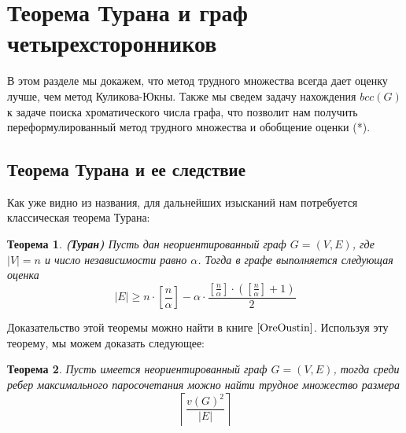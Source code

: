 \documentclass[a4paper]{article}
\newtheorem{mtheorem}{Теорема}[section]
\begin{document}
\setcounter{mclaim}{0}
\setcounter{mlemma}{0}
\setcounter{mtheorem}{0}
\addtocounter{section}{1}
\section*{Теорема Турана и граф четырехсторонников}
В этом разделе мы докажем, что метод трудного множества всегда дает оценку лучше, чем метод Куликова-Юкны. 
Также мы сведем задачу нахождения $bcc(G)$ к задаче поиска хроматического числа графа, 
что позволит нам получить переформулированный метод трудного множества и обобщение оценки (*).  

\setcounter{subsection}{0}
\subsection{Теорема Турана и ее следствие}
Как уже видно из названия, для дальнейших изысканий нам потребуется классическая теорема Турана:
\begin{mtheorem}\emph{\textbf{(Туран)}}
    Пусть дан неориентированный граф $G = (V, E)$, где $|V| = n$ и число независимости равно $\alpha$. 
    Тогда в графе выполняется следующая оценка $$|E| \geq n\cdot\left[\frac{n}{\alpha}\right] - 
    \alpha\cdot\frac{\left[\frac{n}{\alpha}\right]\cdot\left(\left[\frac{n}{\alpha}\right] + 1\right)}{2}$$
\end{mtheorem}

Доказательство этой теоремы можно найти в книге $\cite{OreOustin}$. Используя эту теорему, мы можем доказать следующее:
\begin{mtheorem}
    Пусть имеется неориентированный граф $G = (V, E)$, тогда среди ребер максимального паросочетания можно 
    найти трудное множество размера $$\left\lceil\frac{v(G)^2}{|E|}\right\rceil$$
\end{mtheorem}
\end{document}
